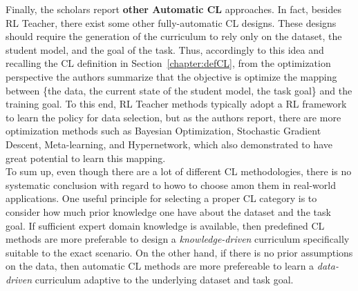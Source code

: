 Finally, the scholars report \textbf{other Automatic CL} approaches. In fact, besides RL Teacher,
there exist some other fully-automatic CL designs. These designs should require the generation of the 
curriculum to rely only on the dataset, the student model, and the goal of the task.
Thus, accordingly to this idea and recalling the CL definition in Section~\ref{chapter:defCL}, from the optimization
perspective the authors summarize that the objective is optimize the mapping between \{the data, the current state 
of the student model, the task goal\} and the training goal. To this end, RL Teacher methods typically adopt a RL framework to learn 
the policy for data selection, but as the authors report, there are more optimization methods 
such as Bayesian Optimization, Stochastic Gradient Descent, Meta-learning, and Hypernetwork, which also demonstrated to have great potential to learn 
this mapping.\\
\newline
To sum up, even though there are a lot of different CL methodologies, there is no systematic conclusion 
with regard to howo to choose amon them in real-world applications. One useful principle for selecting 
a proper CL category is to consider how much prior knowledge one have about the dataset and the task goal.
If sufficient expert domain knowledge is available, then predefined CL methods are more preferable to design a \textit{knowledge-driven} curriculum 
specifically suitable to the exact scenario. On the other hand, if there is no prior assumptions on the data, then 
automatic CL methods are more prefereable to learn a \textit{data-driven} curriculum adaptive to the underlying dataset and task goal.

